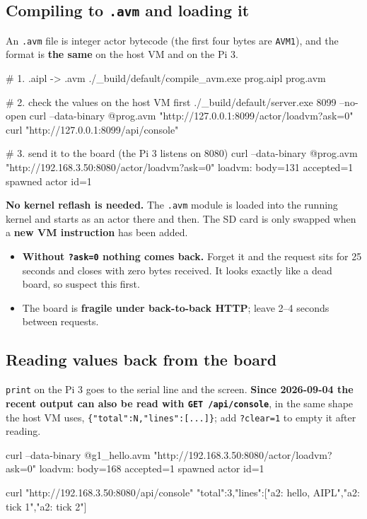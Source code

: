 \documentclass[11pt,a4paper]{article}
\begin{document}
\subsection{Compiling to \texttt{.avm} and loading it}

An \texttt{.avm} file is integer actor bytecode (the first four bytes are
\texttt{AVM1}), and the format is \textbf{the same} on the host VM and on the
Pi 3.

\begin{term}
# 1. .aipl -> .avm
./_build/default/compile_avm.exe prog.aipl prog.avm

# 2. check the values on the host VM first
./_build/default/server.exe 8099 --no-open
curl --data-binary @prog.avm "http://127.0.0.1:8099/actor/loadvm?ask=0"
curl "http://127.0.0.1:8099/api/console"

# 3. send it to the board (the Pi 3 listens on 8080)
curl --data-binary @prog.avm "http://192.168.3.50:8080/actor/loadvm?ask=0"
loadvm: body=131 accepted=1 spawned actor id=1
\end{term}

\textbf{No kernel reflash is needed.} The \texttt{.avm} module is loaded into
the running kernel and starts as an actor there and then. The SD card is only
swapped when a \textbf{new VM instruction} has been added.

\begin{itemize}
\item \textbf{Without \texttt{?ask=0} nothing comes back.} Forget it and the
  request sits for 25 seconds and closes with zero bytes received. It looks
  exactly like a dead board, so suspect this first.
\item The board is \textbf{fragile under back-to-back HTTP}; leave 2--4 seconds
  between requests.
\end{itemize}

\subsection{Reading values back from the board}
\label{sec:pi3-console}

\texttt{print} on the Pi 3 goes to the serial line and the screen.
\textbf{Since 2026-09-04 the recent output can also be read with
\texttt{GET /api/console}}, in the same shape the host VM uses,
\texttt{\{"total":N,"lines":[...]\}}; add \texttt{?clear=1} to empty it after reading.

\begin{term}
curl --data-binary @g1_hello.avm "http://192.168.3.50:8080/actor/loadvm?ask=0"
loadvm: body=168 accepted=1 spawned actor id=1

curl "http://192.168.3.50:8080/api/console"
{"total":3,"lines":["a2: hello, AIPL","a2: tick 1","a2: tick 2"]}
\end{term}
\end{document}
